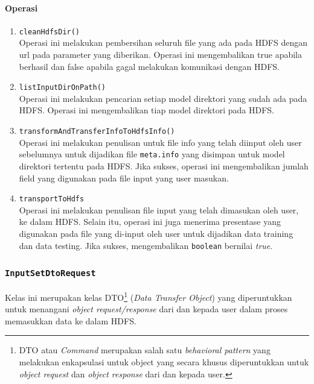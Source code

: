 	\paragraph{Operasi}
		\begin{enumerate}
			\item \texttt{cleanHdfsDir()}\\
			Operasi ini melakukan pembersihan seluruh file yang ada pada HDFS dengan url pada parameter yang diberikan. Operasi ini mengembalikan true apabila berhasil dan false apabila gagal melakukan komunikasi dengan HDFS.
			
			\item \texttt{listInputDirOnPath()}\\
			Operasi ini melakukan pencarian setiap model direktori yang sudah ada pada HDFS. Operasi ini mengembalikan tiap model direktori pada HDFS.
			
			\item \texttt{transformAndTransferInfoToHdfsInfo()}\\
			Operasi ini melakukan penulisan untuk file info yang telah diinput oleh user sebelumnya untuk dijadikan file \texttt{meta.info} yang disimpan untuk model direktori tertentu pada HDFS. Jika sukses, operasi ini mengembalikan jumlah field yang digunakan pada file input yang user masukan.
			
			\item \texttt{transportToHdfs}\\
			Operasi ini melakukan penulisan file input yang telah dimasukan oleh user, ke dalam HDFS. Selain itu, operasi ini juga menerima presentase yang digunakan pada file yang di-input oleh user untuk dijadikan data training dan data testing. Jika sukses, mengembalikan \texttt{boolean} bernilai \textit{true}.
			
		\end{enumerate}
		
	
	
	\subsubsection{\texttt{InputSetDtoRequest}}
	Kelas ini merupakan kelas DTO\footnote{DTO atau \textit{Command} merupakan salah satu \textit{behavioral pattern} yang melakukan enkapsulasi untuk object yang secara khusus diperuntukkan untuk \textit{object request} dan \textit{object response} dari dan kepada user.} (\textit{Data Transfer Object}) yang diperuntukkan untuk menangani \textit{object request/response} dari dan kepada user dalam proses memasukkan data ke dalam HDFS.


